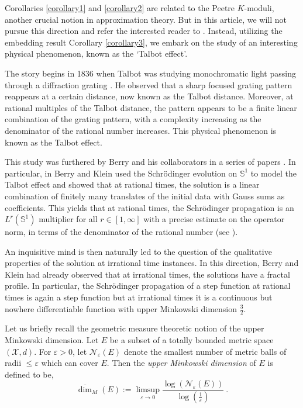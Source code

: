 \documentclass[12pt]{amsart}
\theoremstyle{definition}
\newcommand{\Sb}{\mathbb S}%
\numberwithin{equation}{section}
\begin{document}
Corollaries \ref{corollary1} and \ref{corollary2} are related to the Peetre $K$-moduli, another crucial notion in approximation theory. But in this article, we will not pursue this direction and refer the interested reader to \cite{Li}. Instead, utilizing the embedding result Corollary \ref{corollary3}, we embark on the study of an interesting physical phenomenon, known as the `Talbot effect'.

The story begins in 1836 when Talbot was studying monochromatic light passing through a diffraction grating \cite{Talbot}. He observed that a sharp focused grating pattern reappears at a certain distance, now known as the Talbot distance. Moreover, at rational multiples of the Talbot distance, the pattern appears to be a finite linear combination of the grating pattern, with a complexity increasing as the denominator of the rational number increases. This physical phenomenon is known as the Talbot effect.

This study was furthered by Berry and his collaborators in a series of papers \cite{Berry1, Berry2, Berry3, Berry4}. In particular, in \cite{Berry2} Berry and Klein used the Schr\"odinger evolution on $\Sb^1$ to model the Talbot effect and showed that at rational times, the solution is a linear combination of finitely many translates of the initial data with Gauss sums as coefficients. This yields that at rational times, the Schr\"odinger propagation is an $L^r(\Sb^1)$ multiplier for all $r \in [1,\infty]$ with a precise estimate on the operator norm, in terms of the denominator of the rational number (see \cite[Theorem 2.27]{Book}). 

An inquisitive mind is then naturally led to the question of the qualitative properties of the solution at irrational time instances. In this direction, Berry and Klein \cite{Berry2} had already observed that at irrational times, the solutions have a fractal profile. In particular, the Schr\"odinger propagation of a step function at rational times is again a step function but at irrational times it is a continuous but nowhere differentiable function with upper Minkowski dimension $\frac{3}{2}$.  

Let us briefly recall the geometric measure theoretic notion of the upper Minkowski dimension. Let $E$ be a subset of a totally bounded metric space $(\mathcal{X},d)$. For $\varepsilon>0$, let $\mathcal{N}_\varepsilon(E)$ denote the smallest number of metric balls of radii $\le \varepsilon$ which can cover $E$. Then the {\it upper Minkowski dimension} of $E$ is defined to be,
\begin{equation} \label{minkowski_defn}
\overline{\dim}_M(E):= \limsup_{\varepsilon \to 0}\frac{\log \left(\mathcal{N}_\varepsilon(E)\right)}{\log \left(\frac{1}{\varepsilon}\right)}\:.
\end{equation}
\end{document}
